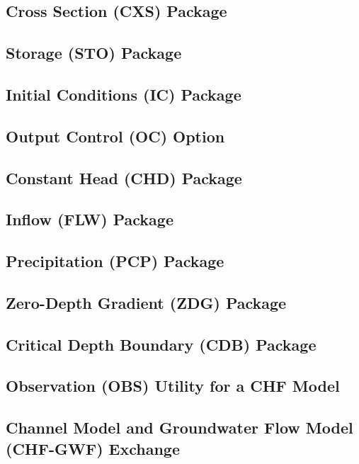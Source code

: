 \newpage
\subsection{Cross Section (CXS) Package}


\newpage
\subsection{Storage (STO) Package}


\newpage
\subsection{Initial Conditions (IC) Package}


\newpage
\subsection{Output Control (OC) Option}


\newpage
\subsection{Constant Head (CHD) Package}


\newpage
\subsection{Inflow (FLW) Package}


\newpage
\subsection{Precipitation (PCP) Package}


\newpage
\subsection{Zero-Depth Gradient (ZDG) Package}


\newpage
\subsection{Critical Depth Boundary (CDB) Package}


\newpage
\subsection{Observation (OBS) Utility for a CHF Model}


\newpage
\subsection{Channel Model and Groundwater Flow Model (CHF-GWF) Exchange}


